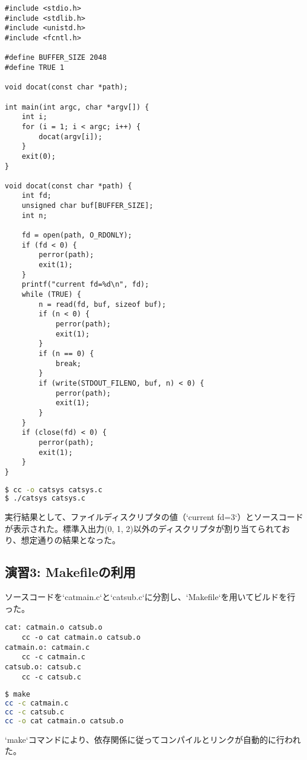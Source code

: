 \documentclass[a4paper,11pt,dvipdfmx]{jsarticle}
\begin{document}
\begin{lstlisting}[caption={catsys.c}, label=lst:catsys]
#include <stdio.h>
#include <stdlib.h>
#include <unistd.h>
#include <fcntl.h>

#define BUFFER_SIZE 2048
#define TRUE 1

void docat(const char *path);

int main(int argc, char *argv[]) {
    int i;
    for (i = 1; i < argc; i++) {
        docat(argv[i]);
    }
    exit(0);
}

void docat(const char *path) {
    int fd;
    unsigned char buf[BUFFER_SIZE];
    int n;

    fd = open(path, O_RDONLY);
    if (fd < 0) {
        perror(path);
        exit(1);
    }
    printf("current fd=%d\n", fd);
    while (TRUE) {
        n = read(fd, buf, sizeof buf);
        if (n < 0) {
            perror(path);
            exit(1);
        }
        if (n == 0) {
            break;
        }
        if (write(STDOUT_FILENO, buf, n) < 0) {
            perror(path);
            exit(1);
        }
    }
    if (close(fd) < 0) {
        perror(path);
        exit(1);
    }
}
\end{lstlisting}

\begin{lstlisting}[language=bash, caption={コンパイルと実行}]
$ cc -o catsys catsys.c
$ ./catsys catsys.c
\end{lstlisting}
実行結果として、ファイルディスクリプタの値（`current fd=3`）とソースコードが表示された。標準入出力(0, 1, 2)以外のディスクリプタが割り当てられており、想定通りの結果となった。

\subsection{演習3: Makefileの利用}
ソースコードを`catmain.c`と`catsub.c`に分割し、`Makefile`を用いてビルドを行った。

\begin{lstlisting}[caption={Makefile}, label=lst:makefile1]
cat: catmain.o catsub.o
	cc -o cat catmain.o catsub.o
catmain.o: catmain.c
	cc -c catmain.c
catsub.o: catsub.c
	cc -c catsub.c
\end{lstlisting}

\begin{lstlisting}[language=bash, caption={makeの実行}]
$ make
cc -c catmain.c
cc -c catsub.c
cc -o cat catmain.o catsub.o
\end{lstlisting}
`make`コマンドにより、依存関係に従ってコンパイルとリンクが自動的に行われた。
\end{document}
